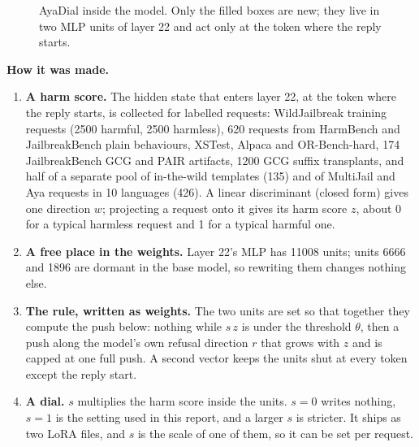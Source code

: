 \documentclass[10pt,a4paper]{article}
\begin{document}
\begin{figure}[H]\centering{}\caption{AyaDial inside the model. Only the filled boxes are new; they live in two MLP units of layer 22 and act only at the token where the reply starts.}\end{figure}
\textbf{How it was made.}
\begin{enumerate}\setlength{\itemsep}{2pt}
\item \textbf{A harm score.} The hidden state that enters layer 22, at the token where the reply starts, is collected for labelled requests: WildJailbreak training requests (2500 harmful, 2500 harmless), 620 requests from HarmBench and JailbreakBench plain behaviours, XSTest, Alpaca and OR-Bench-hard, 174 JailbreakBench GCG and PAIR artifacts, 1200 GCG suffix transplants, and half of a separate pool of in-the-wild templates (135) and of MultiJail and Aya requests in 10 languages (426). A linear discriminant (closed form) gives one direction $w$; projecting a request onto it gives its harm score $z$, about 0 for a typical harmless request and 1 for a typical harmful one.
\item \textbf{A free place in the weights.} Layer 22's MLP has 11008 units; units 6666 and 1896 are dormant in the base model, so rewriting them changes nothing else.
\item \textbf{The rule, written as weights.} The two units are set so that together they compute the push below: nothing while $s\,z$ is under the threshold $\theta$, then a push along the model's own refusal direction $r$ that grows with $z$ and is capped at one full push. A second vector keeps the units shut at every token except the reply start.
\item \textbf{A dial.} $s$ multiplies the harm score inside the units. $s = 0$ writes nothing, $s = 1$ is the setting used in this report, and a larger $s$ is stricter. It ships as two LoRA files, and $s$ is the scale of one of them, so it can be set per request.
\end{enumerate}
\end{document}
